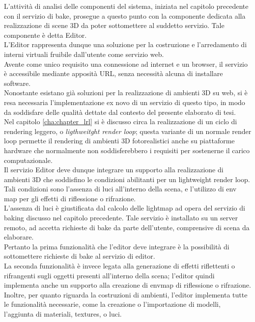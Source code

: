 L’attività di analisi delle componenti del sistema, iniziata nel capitolo precedente con il servizio di bake, prosegue a questo punto con la componente dedicata alla realizzazione di scene 3D da poter sottomettere al suddetto servizio. Tale componente è detta Editor.
\\
L’Editor rappresenta dunque una soluzione per la costruzione e l’arredamento di interni virtuali fruibile dall’utente come servizio web.
\\
Avente come unico requisito una connessione ad internet e un browser, il servizio è accessibile mediante apposità URL, senza necessità alcuna di installare software.
\\ 
Nonostante esistano già soluzioni per la realizzazione di ambienti 3D su web, si è resa necessaria l’implementazione ex novo di un servizio di questo tipo, in modo da soddisfare delle qualità dettate dal contesto del presente elaborato di tesi.
\\
Nel capitolo \ref{cha:chapter_lrl} si è discusso circa la realizzazione di un ciclo di rendering leggero, o \emph{ligthweitght render loop}; questa variante di un normale render loop permette il rendering di ambienti 3D fotorealistici anche su piattaforme hardware che normalmente non soddisferebbero i requisiti per sostenerne il carico computazionale.
\\
Il servizio Editor deve dunque integrare un supporto alla realizzazione di ambienti 3D che soddisfino le condizioni abilitanti per un lightweight render loop. Tali condizioni sono l’assenza di luci all’interno della scena, e l’utilizzo di env map per gli effetti di riflessione o rifrazione.
\\
L’assenza di luci è giustificata dal calcolo delle lightmap ad opera del servizio di baking discusso nel capitolo precedente. Tale servizio è installato su un server remoto, ad accetta richieste di bake da parte dell’utente, comprensive di scena da elaborare.
\\ 
Pertanto la prima funzionalità che l’editor deve integrare è la possibilità di sottomettere richieste di bake al servizio di editor.
\\
La seconda funzionalità è invece legata alla generazione di effetti riflettenti o rifrangenti sugli oggetti presenti all’interno della scena; l’editor quindi implementa anche un supporto alla creazione di envmap di riflessione o rifrazione.
\\
Inoltre, per quanto riguarda la costruzioni di ambienti, l’editor implementa tutte le funzionalità necessarie, come la creazione o l’importazione di modelli, l’aggiunta di materiali, textures, o luci.
